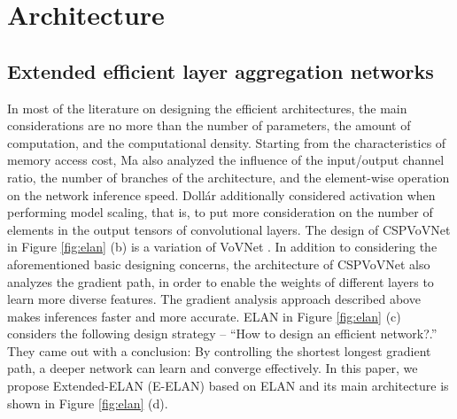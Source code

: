 \documentclass[10pt,twocolumn,letterpaper]{article}
\begin{document}
		
		
		\newpage
		
\section{Architecture}
		
		
		
		\subsection{Extended efficient layer aggregation networks}
		
		In most of the literature on designing the efficient architectures, the main considerations are no more than the number of parameters, the amount of computation, and the computational density. Starting from the characteristics of memory access cost, Ma \etal \cite{ma2018shufflenetv2} also analyzed the influence of the input/output channel ratio, the number of branches of the architecture, and the element-wise operation on the network inference speed. Doll{\'a}r \etal \cite{dollar2021fast} additionally considered activation when performing model scaling, that is, to put more consideration on the number of elements in the output tensors of convolutional layers. The design of CSPVoVNet \cite{wang2021scaled} in Figure \ref{fig:elan} (b) is a variation of VoVNet \cite{lee2019energy}. In addition to considering the aforementioned basic designing concerns, the architecture of CSPVoVNet \cite{wang2021scaled} also analyzes the gradient path, in order to enable the weights of different layers to learn more diverse features. The gradient analysis approach described above makes inferences faster and more accurate. ELAN \cite{wang2022designing} in Figure \ref{fig:elan} (c) considers the following design strategy -- ``How to design an efficient network?.'' They came out with a conclusion: By controlling the shortest longest gradient path, a deeper network can learn and converge effectively. In this paper, we propose Extended-ELAN (E-ELAN) based on ELAN and its main architecture is shown in Figure \ref{fig:elan} (d).
		
\end{document}
